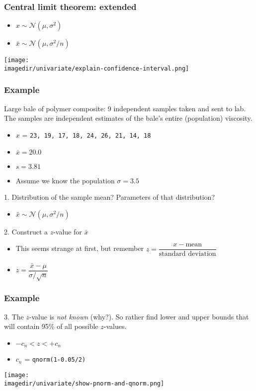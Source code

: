 \begin{frame}\frametitle{Central limit theorem: extended}
	\begin{itemize}
		\item $x \sim \mathcal{N}\left(\mu, \sigma^2 \right)$
		\item $\bar{x} \sim \mathcal{N}\left(\mu, \sigma^2/n \right)$
	\end{itemize}

	\texttt{[image: \\imagedir/univariate/explain-confidence-interval.png]}
\end{frame}

\begin{frame}\frametitle{Example}

	Large bale of polymer composite: 9 independent samples taken and sent to lab. The samples are independent estimates of the bale's entire (population) viscosity.
	\begin{itemize}
		\item $x$ = \texttt{23, 19, 17, 18, 24, 26, 21, 14, 18}
		\item $\bar{x} = 20.0$
		\item $s=3.81$
		\item Assume we know the population $\sigma=3.5$
	\end{itemize}

	1. Distribution of the sample mean? Parameters of that distribution? \pause
	\begin{itemize}
		\item$\bar{x} \sim \mathcal{N}\left(\mu, \sigma^2/n \right)$ \pause
	\end{itemize}
	2. Construct a $z$-value for $\bar{x} $
	\begin{itemize}
		\item This seems strange at first, but remember $z = \dfrac{x - \text{mean}}{\text{standard deviation}}$
		\item $z = \dfrac{\bar{x} -\mu}{\sigma/\sqrt{n}}$
	\end{itemize}
\end{frame}

\begin{frame}\frametitle{Example}

	3. The $z$-value is \emph{not known} (why?). So rather find lower and upper bounds that will contain 95\% of all possible $z$-values.
	\begin{itemize}
		\item$-c_n < z < +c_n$
		\item$c_n$ = \texttt{qnorm(1-0.05/2)}\pause
	\end{itemize}
	\begin{center}
		\texttt{[image: \\imagedir/univariate/show-pnorm-and-qnorm.png]}
	\end{center}
\end{frame}

